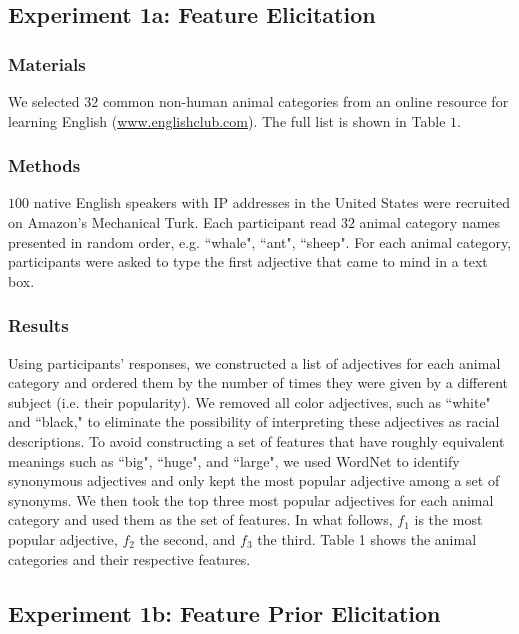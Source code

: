 \documentclass[10pt,letterpaper]{article}
\begin{document}
\subsection{Experiment 1a: Feature Elicitation}
\subsubsection{Materials}
We selected $32$ common non-human animal categories from an online resource for learning English (\url{www.englishclub.com}). The full list is shown in Table $1$.
\subsubsection{Methods}
$100$ native English speakers with IP addresses in the United States were recruited on Amazon's Mechanical Turk. Each participant read $32$ animal category names presented in random order, e.g. ``whale", ``ant", ``sheep". For each animal category, participants were asked to type the first adjective that came to mind in a text box. 
\subsubsection{Results}
Using participants' responses, we constructed a list of adjectives for each animal category and ordered them by the number of times they were given by a different subject (i.e. their popularity). We removed all color adjectives, such as ``white" and ``black," to eliminate the possibility of interpreting these adjectives as racial descriptions. To avoid constructing a set of features that have roughly equivalent meanings such as ``big", ``huge", and ``large", we used WordNet \cite{Miller95wordnet:a} to identify synonymous adjectives and only kept the most popular adjective among a set of synonyms. We then took the top three most popular adjectives for each animal category and used them as the set of features. In what follows, $f_1$ is the most popular adjective, $f_2$ the second, and $f_3$ the third. Table 1 shows the animal categories and their respective features.

\subsection{Experiment 1b: Feature Prior Elicitation}
\end{document}
